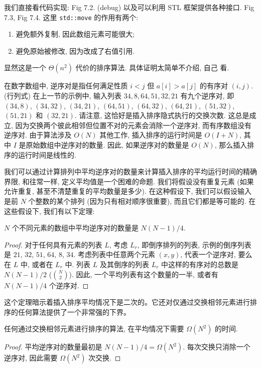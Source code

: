 \documentclass[a4paper]{ctexart}
\newcommand{\hl}[1]
{\noindent {\bf {#1}}}
\theoremstyle{definition}
\theoremstyle{definition}
\begin{document}
我们直接看代码实现: Fig 7.2. (debug) 以及可以利用 STL 框架提供各种接口.
Fig 7.3, Fig 7.4. 这里 \verb|std::move| 的作用有两个: 
\begin{enumerate}
  \item 避免额外复制, 因此数组元素可能很大; 
  \item 避免原始被修改, 因为改成了右值引用. 
\end{enumerate}

显然这是一个 $\Theta(n^2)$ 代价的排序算法. 具体证明太简单不介绍, 自己
看. 

在数字数组中, 逆序对是指任何满足性质 $i < j$ 但 $a[i] > a[j]$ 的有序对 $(i, j)$. 
(行列式) 在上一节的示例中, 输入列表 $34, 8, 64, 51, 32, 21$ 有九个逆序对, 
即 $(34, 8)$, $(34, 32)$, $(34, 21)$, $(64, 51)$, $(64, 32)$, 
$(64, 21)$, $(51, 32)$, $(51, 21)$ 和 $(32, 21)$. 
请注意, 这恰好是插入排序隐式执行的交换次数. 这总是成立, 
因为交换两个彼此相邻但位置不对的元素会消除一个逆序对, 而有序数组没有逆序对. 
由于算法涉及 $O(N)$ 其他工作, 插入排序的运行时间是 $O(I + N)$, 
其中 $I$ 是原始数组中逆序对的数量. 因此, 如果逆序对的数量是 $O(N)$, 
那么插入排序的运行时间是线性的. 

我们可以通过计算排列中平均逆序对的数量来计算插入排序的平均运行时间的精确界限, 
和往常一样, 定义平均值是一个困难的命题. 我们将假设没有重复元素 
(如果允许重复, 甚至不清楚重复的平均数量是多少). 在这种假设下, 
我们可以假设输入是前 $N$ 个整数的某个排列 (因为只有相对顺序很重要), 
而且它们都是等可能的. 在这些假设下, 我们有以下定理:

\hl{定理 7.1} $N$ 个不同元素的数组中平均逆序对的数量是 $N(N - 1)/4$.

\begin{proof}
对于任何具有元素的列表 $L$, 考虑 $L_r$, 即倒序排列的列表, 
示例的倒序列表是 $21$, $32$, $51$, $64$, $8$, $34$. 
考虑列表中任意两个元素 $(x, y)$, 代表一个逆序对, 要么在 $L$ 中, 或者在 $L_r$ 中.  
列表 $L$ 及其倒序的列表 $L_r$ 中这样的有序对的总数是 $N(N - 1)/2$ 
($N \choose 2$). 
因此, 一个平均列表有这个数量的一半, 或者有 $N(N - 1)/4$ 个逆序对.   
\end{proof}

这个定理暗示着插入排序平均情况下是二次的。它还对仅通过交换相邻元素进行排序的任何算法提供了一个非常强的下界。

\hl{定理 7.2} 任何通过交换相邻元素进行排序的算法, 在平均情况下需要 $\Omega(N^2)$ 
的时间. 

\begin{proof}
平均逆序对的数量最初是 $N(N - 1)/4 = \Omega(N^2)$. 每次交换只消除一个逆序对, 
因此需要 $\Omega(N^2)$ 次交换.
\end{proof}  
\end{document}
